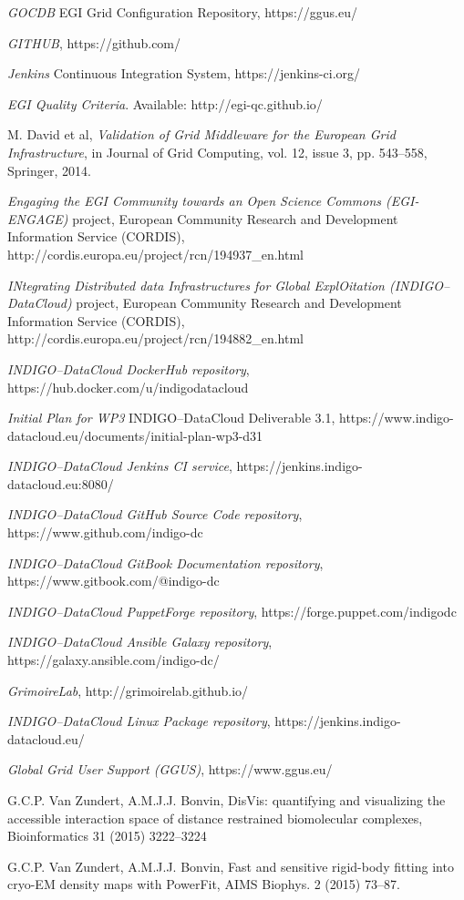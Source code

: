 \documentclass[journal]{IEEEtran}
\begin{document}
\begin{thebibliography}{1}
\emph{GOCDB} EGI Grid Configuration Repository,
https://ggus.eu/

\emph{GITHUB},
https://github.com/

\emph{Jenkins} Continuous Integration System,
https://jenkins-ci.org/

\emph{EGI Quality Criteria}. Available: http://egi-qc.github.io/

M. David et al, \emph{Validation of Grid Middleware for the European Grid
Infrastructure}, in Journal of Grid Computing, vol. 12, issue 3, pp. 543–558,
Springer, 2014.

\emph{Engaging the EGI Community towards an Open Science Commons (EGI-ENGAGE)}
project, European Community Research and Development Information Service
(CORDIS), http://cordis.europa.eu/project/rcn/194937\_en.html

\emph{INtegrating Distributed data Infrastructures for Global ExplOitation
(INDIGO--DataCloud)} project, European Community Research and Development
Information Service (CORDIS),
http://cordis.europa.eu/project/rcn/194882\_en.html

\emph{INDIGO--DataCloud DockerHub repository},
https://hub.docker.com/u/indigodatacloud

\emph{Initial Plan for WP3} INDIGO--DataCloud Deliverable 3.1,
https://www.indigo-datacloud.eu/documents/initial-plan-wp3-d31

\emph{INDIGO--DataCloud Jenkins CI service},
https://jenkins.indigo-datacloud.eu:8080/

\emph{INDIGO--DataCloud GitHub Source Code repository},
https://www.github.com/indigo-dc

\emph{INDIGO--DataCloud GitBook Documentation repository},
https://www.gitbook.com/@indigo-dc

\emph{INDIGO--DataCloud PuppetForge repository},
https://forge.puppet.com/indigodc

\emph{INDIGO--DataCloud Ansible Galaxy repository},
https://galaxy.ansible.com/indigo-dc/

\emph{GrimoireLab}, http://grimoirelab.github.io/

\emph{INDIGO--DataCloud Linux Package repository}, https://jenkins.indigo-datacloud.eu/

\emph{Global Grid User Support (GGUS)}, https://www.ggus.eu/

 G.C.P. Van Zundert, A.M.J.J. Bonvin,
DisVis: quantifying and visualizing the accessible interaction space of distance
restrained biomolecular complexes, Bioinformatics 31 (2015) 3222–3224

 G.C.P. Van Zundert, A.M.J.J. Bonvin,
Fast and sensitive rigid-body fitting into cryo-EM density maps with PowerFit,
AIMS Biophys. 2 (2015) 73–87.

\end{thebibliography}
\end{document}
